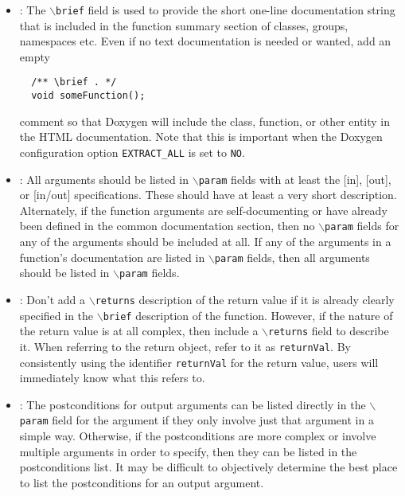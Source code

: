 \begin{itemize}
\item\DOXAddBrief: The {}\texttt{$\backslash$brief} field is used to
  provide the short one-line documentation string that is included in
  the function summary section of classes, groups, namespaces etc.
  Even if no text documentation is needed or wanted, add an empty
%
{\small\begin{verbatim}
  /** \brief . */
  void someFunction();
\end{verbatim}}
%
comment so that Doxygen will include the class, function, or other entity in
the HTML documentation.  Note that this is important when the Doxygen
configuration option {}\texttt{EXTRACT\-\_ALL} is set to {}\texttt{NO}.


\item\DOXAllOrNoneParam: All arguments should be listed in
  \texttt{$\backslash$param} fields with at least the [in], [out], or
  [in/out] specifications.  These should have at least a very short
  description.  Alternately, if the function arguments are
  self-documenting or have already been defined in the common
  documentation section, then no \texttt{$\backslash$param} fields for
  any of the arguments should be included at all.  If any of the
  arguments in a function's documentation are listed in
  \texttt{$\backslash$param} fields, then all arguments should be
  listed in \texttt{$\backslash$param} fields.


\item\DOXReturnsOnlyIfNeeded: Don't add a \texttt{$\backslash$returns}
  description of the return value if it is already clearly specified
  in the \texttt{$\backslash$brief} description of the function.
  However, if the nature of the return value is at all complex, then
  include a \texttt{$\backslash$returns} field to describe it.  When
  referring to the return object, refer to it as \texttt{returnVal}.
  By consistently using the identifier \texttt{returnVal} for the
  return value, users will immediately know what this refers to.


\item\DOXPreferPostconditionsInParam: The postconditions for output
  arguments can be listed directly in the \texttt{$\backslash$param}
  field for the argument if they only involve just that argument in a
  simple way.  Otherwise, if the postconditions are more complex or
  involve multiple arguments in order to specify, then they can be
  listed in the postconditions list.  It may be difficult to
  objectively determine the best place to list the postconditions for
  an output argument.



\end{itemize}

